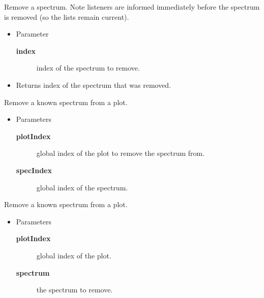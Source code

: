 \begin{desc}Remove a spectrum. Note listeners are informed immediately
  before the spectrum is removed (so the lists remain current).
\begin{itemize}
\item{Parameter
  \begin{description}
   \item[\textbf{index}]{index of the spectrum to remove.}
  \end{description}}
\end{itemize}
\begin{itemize}
\item{Returns index of the spectrum that was removed. }
\end{itemize}
\end{desc}

\begin{desc}Remove a known spectrum from a plot.
\begin{itemize}
\item{Parameters
  \begin{description}
   \item[\textbf{plotIndex}]{global index of the plot to remove the
                   spectrum from.}
   \item[\textbf{specIndex}]{global index of the spectrum.}
  \end{description}}
\end{itemize}
\end{desc}

\begin{desc}Remove a known spectrum from a plot.
\begin{itemize}
\item{Parameters
  \begin{description}
   \item[\textbf{plotIndex}]{global index of the plot.}
   \item[\textbf{spectrum}]{the spectrum to remove.}
  \end{description}}
\end{itemize}
\end{desc}


